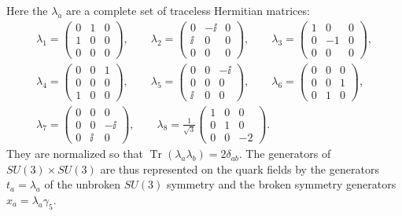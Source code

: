 Here the $\lambda_a$ are a complete set of traceless Hermitian matrices:
\begin{equation}
\begin{gathered}
\lambda_1=\begin{pmatrix}0&1&0\\1&0&0\\0&0&0\end{pmatrix},
\qquad
\lambda_2=\begin{pmatrix}0&-\ii&0\\\ii&0&0\\0&0&0\end{pmatrix},
\qquad
\lambda_3=\begin{pmatrix}1&0&0\\0&-1&0\\0&0&0\end{pmatrix},
\\[6pt]
\lambda_4=\begin{pmatrix}0&0&1\\0&0&0\\1&0&0\end{pmatrix},
\qquad
\lambda_5=\begin{pmatrix}0&0&-\ii\\0&0&0\\\ii&0&0\end{pmatrix},
\qquad
\lambda_6=\begin{pmatrix}0&0&0\\0&0&1\\0&1&0\end{pmatrix},
\\[6pt]
\lambda_7=\begin{pmatrix}0&0&0\\0&0&-\ii\\0&\ii&0\end{pmatrix},
\qquad
\lambda_8=\frac{1}{\sqrt3}
\begin{pmatrix}1&0&0\\0&1&0\\0&0&-2\end{pmatrix}.
\end{gathered}
\tag{19.7.2}\label{eq:19.7.2}
\end{equation}
They are normalized so that $\operatorname{Tr}(\lambda_a\lambda_b)=2\delta_{ab}$. The generators of $SU(3)\times SU(3)$ are thus represented on the quark fields by the generators $t_a=\lambda_a$ of the unbroken $SU(3)$ symmetry and the broken symmetry generators $x_a=\lambda_a\gamma_5$.

